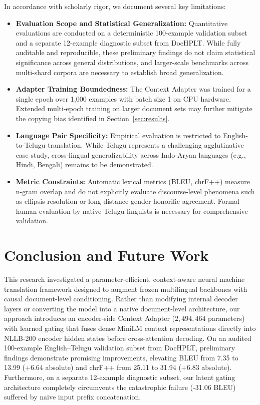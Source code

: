 \documentclass[conference]{IEEEtran}
\begin{document}
In accordance with scholarly rigor, we document several key limitations:
\begin{itemize}
    \item \textbf{Evaluation Scope and Statistical Generalization:} Quantitative evaluations are conducted on a deterministic 100-example validation subset and a separate 12-example diagnostic subset from DocHPLT. While fully auditable and reproducible, these preliminary findings do not claim statistical significance across general distributions, and larger-scale benchmarks across multi-shard corpora are necessary to establish broad generalization.
    \item \textbf{Adapter Training Boundedness:} The Context Adapter was trained for a single epoch over 1,000 examples with batch size 1 on CPU hardware. Extended multi-epoch training on larger document sets may further mitigate the copying bias identified in Section~\ref{sec:results}.
    \item \textbf{Language Pair Specificity:} Empirical evaluation is restricted to English-to-Telugu translation. While Telugu represents a challenging agglutinative case study, cross-lingual generalizability across Indo-Aryan languages (e.g., Hindi, Bengali) remains to be demonstrated.
    \item \textbf{Metric Constraints:} Automatic lexical metrics (BLEU, chrF++) measure n-gram overlap and do not explicitly evaluate discourse-level phenomena such as ellipsis resolution or long-distance gender-honorific agreement. Formal human evaluation by native Telugu linguists is necessary for comprehensive validation.
\end{itemize}

\section{Conclusion and Future Work}
\label{sec:conclusion}

This research investigated a parameter-efficient, context-aware neural machine translation framework designed to augment frozen multilingual backbones with causal document-level conditioning. Rather than modifying internal decoder layers or converting the model into a native document-level architecture, our approach introduces an encoder-side Context Adapter ($2,494,464$ parameters) with learned gating that fuses dense MiniLM context representations directly into NLLB-200 encoder hidden states before cross-attention decoding. On an audited 100-example English--Telugu validation subset from DocHPLT, preliminary findings demonstrate promising improvements, elevating BLEU from 7.35 to 13.99 (+6.64 absolute) and chrF++ from 25.11 to 31.94 (+6.83 absolute). Furthermore, on a separate 12-example diagnostic subset, our latent gating architecture completely circumvents the catastrophic failure (-31.06 BLEU) suffered by naive input prefix concatenation.
\end{document}
